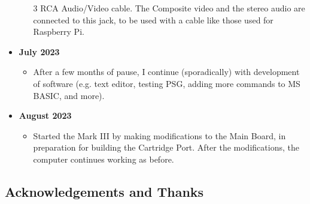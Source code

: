 \documentclass[a4paper,11pt]{article}
\begin{document}
\begin{itemize}
\begin{itemize}
            3 RCA Audio/Video cable. The Composite video and the stereo audio
            are connected to this jack, to be used with a cable like those used
            for  Raspberry Pi.
        \end{itemize}
        \item \textbf{July 2023}
        \begin{itemize}
            \item After a few months of pause, I continue (sporadically) with
            development of software (e.g. text editor, testing PSG, adding more
            commands to MS BASIC, and more).
        \end{itemize}
        \item \textbf{August 2023}
        \begin{itemize}
            \item Started the Mark III by making modifications to the Main Board,
            in preparation for building the Cartridge Port. After the
            modifications, the computer continues working as before.
        \end{itemize}
    \end{itemize}

    \subsection{Acknowledgements and Thanks}
\end{document}
